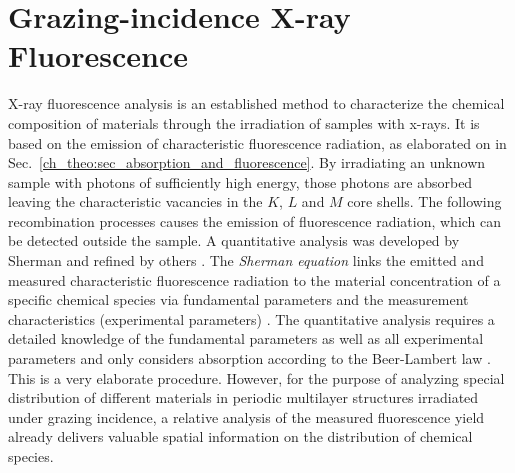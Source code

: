 \section{Grazing-incidence X-ray Fluorescence} \label{ch_theo:sec_xrf}
X-ray fluorescence analysis is an established method to characterize the chemical composition of materials through the irradiation of samples with x-rays. It is based on the emission of characteristic fluorescence radiation, as elaborated on in Sec.~\ref{ch_theo:sec_absorption_and_fluorescence}. By irradiating an unknown sample with photons of sufficiently high energy, those photons are absorbed leaving the characteristic vacancies in the $K$, $L$ and $M$ core shells. The following recombination processes causes the emission of fluorescence radiation, which can be detected outside the sample. A quantitative analysis was developed by Sherman \cite{sherman_theoretical_1955} and refined by others \cite{shiraiwa_theoretical_1966, criss_calculation_1968, rasberry_calibration_1974}. The \emph{Sherman equation} links the emitted and measured characteristic fluorescence radiation to the material concentration of a specific chemical species via fundamental parameters and the measurement characteristics (experimental parameters) \cite{rousseau_fundamental_1984}. The quantitative analysis requires a detailed knowledge of the fundamental parameters as well as all experimental parameters and only considers absorption according to the Beer-Lambert law \cite{als-nielsen_x-rays_2011}. This is a very elaborate procedure. However, for the purpose of analyzing special distribution of different materials in periodic multilayer structures irradiated under grazing incidence, a relative analysis of the measured fluorescence yield already delivers valuable spatial information on the distribution of chemical species.

